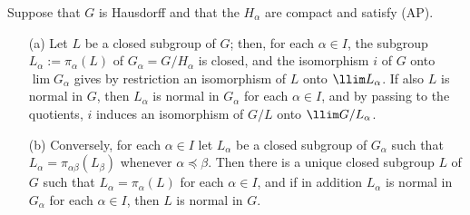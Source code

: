 \begin{proposition}\label{topological group inverse limit of compact quotient prop}
Suppose that $G$ is Hausdorff and that the $H_\alpha$ are compact and satisfy (AP).
\begin{itemize}
\item[(a)] Let $L$ be a closed subgroup of $G$; then, for each $\alpha\in I$, the subgroup $L_\alpha:=\pi_\alpha(L)$ of $G_\alpha=G/H_\alpha$ is closed, and the isomorphism $i$ of $G$ onto $\lim G_\alpha$ gives by restriction an isomorphism of $L$ onto $\llim L_\alpha$. If also $L$ is normal in $G$, then $L_\alpha$ is normal in $G_\alpha$ for each $\alpha\in I$, and by passing to the quotients, $i$ induces an isomorphism of $G/L$ onto $\llim G/L_\alpha$.
\item[(b)] Conversely, for each $\alpha\in I$ let $L_\alpha$ be a closed subgroup of $G_\alpha$ such that $L_\alpha=\pi_{\alpha\beta}(L_\beta)$ whenever $\alpha\preceq\beta$. Then there is a unique closed subgroup $L$ of $G$ such that $L_\alpha=\pi_\alpha(L)$ for each $\alpha\in I$, and if in addition $L_\alpha$ is normal in $G_\alpha$ for each $\alpha\in I$, then $L$ is normal in $G$. 
\end{itemize}
\end{proposition}
